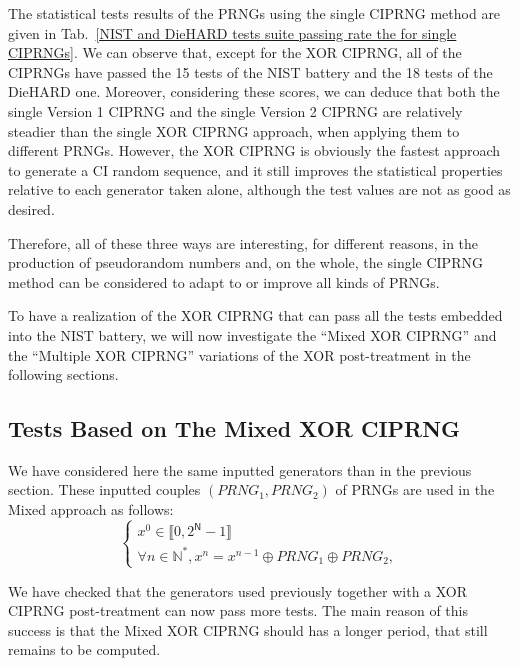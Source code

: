 The statistical tests results of the PRNGs using the single CIPRNG method are given in Tab.~\ref{NIST and DieHARD tests suite passing rate the for single CIPRNGs}.
We can observe that, except for the XOR CIPRNG, all of the CIPRNGs have passed the 15 tests of the NIST battery and the 18 tests of the DieHARD one.
Moreover, considering these scores, we can deduce that both the single Version 1 CIPRNG and the single Version 2 CIPRNG are relatively steadier than the single XOR CIPRNG approach, when applying them to different PRNGs.
However, the XOR CIPRNG is obviously the fastest approach to generate a CI random sequence, and it still improves the statistical properties relative to each generator taken alone, although the test values are not as good as desired.

Therefore, all of these three ways are interesting, for different reasons, in the production of pseudorandom numbers and,
on the whole, the single CIPRNG method can be considered to adapt to or improve all kinds of PRNGs.

To have a realization of the XOR CIPRNG that can pass all the tests embedded into the NIST battery, we will now investigate the ``Mixed XOR CIPRNG'' and the ``Multiple XOR
CIPRNG'' variations of the XOR post-treatment in the following sections.



\subsection{Tests Based on The Mixed XOR CIPRNG}

We have considered here the same inputted generators than in the previous section.
These inputted couples $(PRNG_1,PRNG_2)$ of PRNGs are used in the Mixed approach as follows:
\begin{equation}
\left\{
\begin{array}{l}
x^0 \in \llbracket 0, 2^\mathsf{N}-1 \rrbracket \\
\forall n \in \mathds{N}^*, x^n = x^{n-1} \oplus PRNG_1\oplus PRNG_2,
\end{array}
\right.
\label{equation Oplus}
\end{equation}

We have checked that the generators used previously together with a XOR CIPRNG post-treatment can now pass more tests.
The main reason of this success is that the Mixed XOR CIPRNG should has a longer period, that still remains to be computed.

